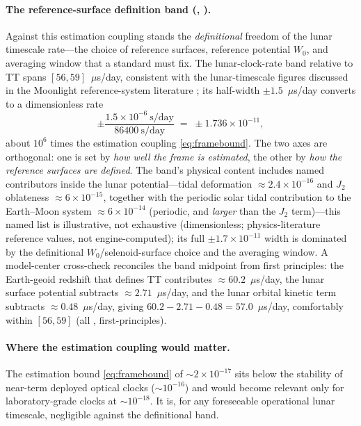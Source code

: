 \paragraph{The reference-surface definition band (\Modelled{}, \modtag{}).}
Against this estimation coupling stands the \emph{definitional} freedom of the lunar
timescale rate---the choice of reference surfaces, reference potential $W_0$, and averaging
window that a standard must fix. The lunar-clock-rate band relative to TT spans
$[56,59]$~$\mu$s/day, consistent with the lunar-timescale figures discussed in the Moonlight
reference-system literature
\citep{fienga2024moonlight}; its half-width $\pm1.5$~$\mu$s/day
converts to a dimensionless rate
\begin{equation}
  \pm\frac{1.5\times10^{-6}\ \text{s/day}}{86400\ \text{s/day}}
  \;=\;\pm1.736\times10^{-11},
  \label{eq:band}
\end{equation}
about $10^{6}$ times the estimation coupling \eqref{eq:framebound}. The two axes are
orthogonal: one is set by \emph{how well the frame is estimated}, the other by \emph{how the
reference surfaces are defined}. The band's physical content includes named contributors
inside the lunar potential---tidal deformation $\approx2.4\times10^{-16}$ and $J_2$
oblateness $\approx6\times10^{-15}$, together with the periodic solar tidal contribution to
the Earth--Moon system $\approx6\times10^{-14}$ (periodic, and \emph{larger} than the $J_2$
term)---this named list is illustrative, not exhaustive (dimensionless; physics-literature
reference values, not engine-computed); its full $\pm1.7\times10^{-11}$ width is dominated by
the definitional $W_0$/selenoid-surface choice and the averaging window. A model-center
cross-check reconciles the band midpoint from first principles: the Earth-geoid redshift
that defines TT contributes $\approx60.2$~$\mu$s/day, the lunar surface potential subtracts
$\approx2.71$~$\mu$s/day, and the lunar orbital kinetic term subtracts
$\approx0.48$~$\mu$s/day, giving $60.2-2.71-0.48=57.0$~$\mu$s/day, comfortably within
$[56,59]$ (all \Modelled{}, first-principles).

\paragraph{Where the estimation coupling would matter.}
The estimation bound \eqref{eq:framebound} of $\sim2\times10^{-17}$ sits below the
stability of near-term deployed optical clocks ($\sim10^{-16}$) and would become relevant
only for laboratory-grade clocks at $\sim10^{-18}$. It is, for any foreseeable operational
lunar timescale, negligible against the definitional band.

